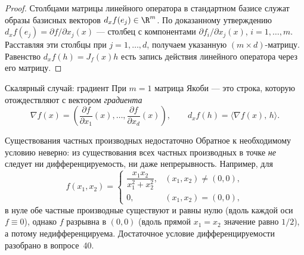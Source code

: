 \begin{proof}
	Столбцами матрицы линейного оператора в стандартном базисе служат образы базисных векторов $d_xf(e_j)\in\R^m$. По доказанному утверждению $d_xf(e_j)=\partial f/\partial x_j(x)$ --- столбец с компонентами $\partial f_i/\partial x_j(x)$, $i=1,\dots,m$. Расставляя эти столбцы при $j=1,\dots,d$, получаем указанную $(m\times d)$-матрицу. Равенство $d_xf(h)=J_f(x)h$ есть запись действия линейного оператора через его матрицу.
\end{proof}

\begin{Remark}{Скалярный случай: градиент}{}
	При $m=1$ матрица Якоби --- это строка, которую отождествляют с вектором \emph{градиента}
	\[
	\nabla f(x)=\left(\frac{\partial f}{\partial x_1}(x),\dots,\frac{\partial f}{\partial x_d}(x)\right),
	\qquad d_xf(h)=\langle\nabla f(x),\,h\rangle.
	\]
\end{Remark}

\begin{Remark}{Существования частных производных недостаточно}{}
	Обратное к необходимому условию неверно: из существования всех частных производных в точке \emph{не} следует ни дифференцируемость, ни даже непрерывность. Например, для
	\[
	f(x_1,x_2)=\begin{cases}\dfrac{x_1x_2}{x_1^2+x_2^2},&(x_1,x_2)\ne(0,0),\\[6pt] 0,&(x_1,x_2)=(0,0),\end{cases}
	\]
	в нуле обе частные производные существуют и равны нулю (вдоль каждой оси $f\equiv0$), однако $f$ разрывна в $(0,0)$ (вдоль прямой $x_1=x_2$ значение равно $1/2$), а потому недифференцируема. Достаточное условие дифференцируемости разобрано в вопросе~40.
\end{Remark}
